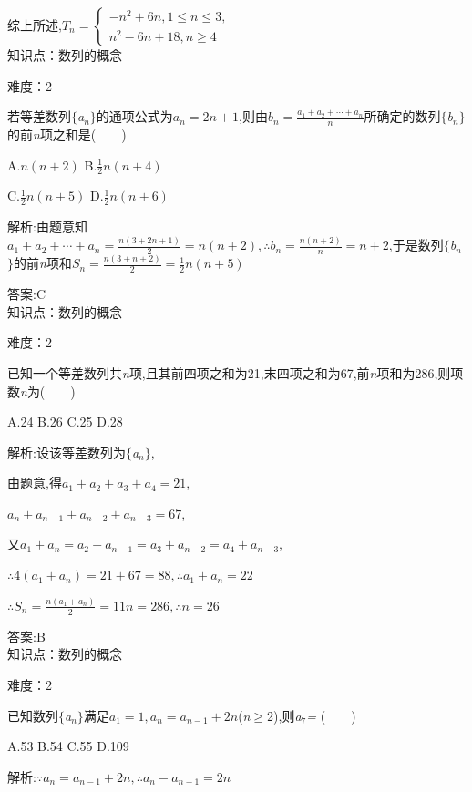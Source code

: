 \documentclass{article} %
\begin{document}
综上所述,$T_n=\left\{
\begin{array}{l}
-n^2+6n,1\le n\le 3, \\
n^2-6n+18,n\ge 4
\end{array}
\right.$ \\

知识点：数列的概念

难度：2

 若等差数列$\mathrm{\{}$\textit{a${}_{n}$}$\mathrm{\}}$的通项公式为$a_n=2n+1$,则由$b_n=\frac{a_1+a_2+\cdots+a_n}{n}$所确定的数列$\mathrm{\{}$\textit{b${}_{n}$}$\mathrm{\}}$的前\textit{n}项之和是(\textit{　　})

 A.$n(n+2)$ B.$\frac{1}{2}n(n+4)$

 C.$\frac{1}{2}n(n+5)$ D.$\frac{1}{2}n(n+6)$

 解析:由题意知$a_1+a_2+\cdots+a_n=\frac{n(3+2n+1)}{2}=n(n+2),\therefore b_n=\frac{n(n+2)}{n}=n+2$,于是数列$\mathrm{\{}$\textit{b${}_{n}$}$\mathrm{\}}$的前\textit{n}项和$S_n=\frac{n(3+n+2)}{2}=\frac{1}{2}n(n+5)$

 答案:C \\

知识点：数列的概念

难度：2

 已知一个等差数列共\textit{n}项,且其前四项之和为21,末四项之和为67,前\textit{n}项和为286,则项数\textit{n}为(\textit{　　})

 A.24 B.26 C.25 D.28

 解析:设该等差数列为$\mathrm{\{}$\textit{a${}_{n}$}$\mathrm{\}}$,

由题意,得$a_1+a_2+a_3+a_4=21$,

$a_n+a_{n-1}+a_{n-2}+a_{n-3}=67$,

又$a_1+a_n=a_2+a_{n-1}=a_3+a_{n-2}=a_4+a_{n-3}$,

$\therefore 4(a_1+a_n)=21+67=88, \therefore a_1+a_n=22$

$\therefore S_n=\frac{n(a_1+a_n)}{2}=11n=286, \therefore n=26$
 
 答案:B \\

知识点：数列的概念

难度：2

 已知数列$\mathrm{\{}$\textit{a${}_{n}$}$\mathrm{\}}$满足$a_1=1,a_n=a_{n-1}+2n$(\textit{n}$\mathrm{\ge}$2),则\textit{a}${}_{7}$\textit{=} (\textit{　　})

 A.53 B.54 C.55 D.109

 解析:$\because a_n=a_{n-1}+2n,\therefore a_n-a_{n-1}=2n$
\end{document}
